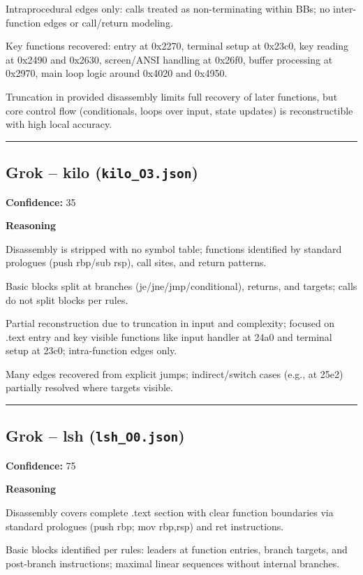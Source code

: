Intraprocedural edges only: calls treated as non-terminating within BBs; no inter-function edges or call/return modeling.

Key functions recovered: entry at 0x2270, terminal setup at 0x23c0, key reading at 0x2490 and 0x2630, screen/ANSI handling at 0x26f0, buffer processing at 0x2970, main loop logic around 0x4020 and 0x4950.

Truncation in provided disassembly limits full recovery of later functions, but core control flow (conditionals, loops over input, state updates) is reconstructible with high local accuracy.

\bigskip
\hrule
\bigskip

\subsection{Grok -- kilo (\texttt{kilo\_O3.json})}

\textbf{Confidence:} 35

\textbf{Reasoning}

Disassembly is stripped with no symbol table; functions identified by standard prologues (push rbp/sub rsp), call sites, and return patterns.

Basic blocks split at branches (je/jne/jmp/conditional), returns, and targets; calls do not split blocks per rules.

Partial reconstruction due to truncation in input and complexity; focused on .text entry and key visible functions like input handler at 24a0 and terminal setup at 23c0; intra-function edges only.

Many edges recovered from explicit jumps; indirect/switch cases (e.g., at 25e2) partially resolved where targets visible.

\bigskip
\hrule
\bigskip

\subsection{Grok -- lsh (\texttt{lsh\_O0.json})}

\textbf{Confidence:} 75

\textbf{Reasoning}

Disassembly covers complete .text section with clear function boundaries via standard prologues (push rbp; mov rbp,rsp) and ret instructions.

Basic blocks identified per rules: leaders at function entries, branch targets, and post-branch instructions; maximal linear sequences without internal branches.

